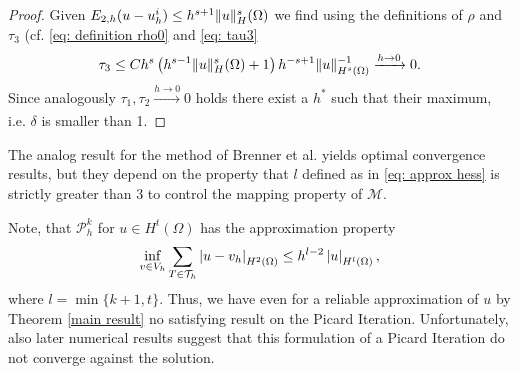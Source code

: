 \begin{proof}
	Given $E_{2,h}(u-u_h^i) \leq h^{s+1} \lVert u \rVert_H^s(\Omega)$ we find using the definitions of $\rho$ and $\tau_3$ (cf. \eqref{eq: definition rho0} and \eqref{eq: tau3}
	\begin{align*}
		\tau_3  \leq C h^{s} \left(h^{s-1} \lVert u \rVert_H^s(\Omega)+1\right) h^{-s+1} \lVert u \rVert_{H^{s}(\Omega)}^{-1} \xrightarrow{h \rightarrow 0}  0.
	\end{align*}
	Since analogously $\tau_1, \tau_2 \xrightarrow[]{h\rightarrow 0} 0$ holds there exist a $h^*$ such that their maximum, i.e. $\delta$ is smaller than 1.
\end{proof}

The analog result for the method of Brenner et al. \cite[Theorem 3.1]{BGN+2011} yields optimal convergence results, but they depend on the property that $l$ defined as in \eqref{eq: approx hess} is strictly greater than $3$ to control the mapping property of $\mathcal M$.
	
Note, that $\mathcal P^k_h$ for $u \in H^t(\Omega)$ has the approximation property 
\begin{align}
	\inf_{v \in V_h} \sum_{T \in \mathcal{T}_h} \left| u-v_h \right|_{H^2(\Omega)} \leq h^{l-2} \left| u \right|_{H^l(\Omega)}, \label{eq: approx hess}
\end{align}
where $l = \min\{k+1,t\}$. Thus, we have even for a reliable approximation of $u$ by Theorem \ref{main result} no satisfying result on the Picard Iteration. 
Unfortunately, also later numerical results suggest that this formulation of a Picard Iteration do not converge against the \MA solution.	
	